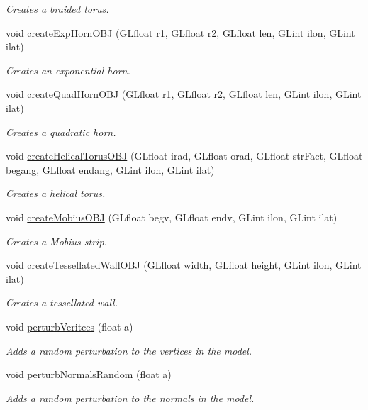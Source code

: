 \begin{DoxyCompactItemize}
\begin{DoxyCompactList}\small\item\em Creates a braided torus. \end{DoxyCompactList}\item 
void \hyperlink{class_models_a447859a7d2ec5fbe587b1172a223444e}{create\+Exp\+Horn\+O\+BJ} (G\+Lfloat r1, G\+Lfloat r2, G\+Lfloat len, G\+Lint ilon, G\+Lint ilat)
\begin{DoxyCompactList}\small\item\em Creates an exponential horn. \end{DoxyCompactList}\item 
void \hyperlink{class_models_afd82cc2a704f451f71ee1e28bbe32c3e}{create\+Quad\+Horn\+O\+BJ} (G\+Lfloat r1, G\+Lfloat r2, G\+Lfloat len, G\+Lint ilon, G\+Lint ilat)
\begin{DoxyCompactList}\small\item\em Creates a quadratic horn. \end{DoxyCompactList}\item 
void \hyperlink{class_models_a2504fa72fb311c5d58dff1d2bdfce25d}{create\+Helical\+Torus\+O\+BJ} (G\+Lfloat irad, G\+Lfloat orad, G\+Lfloat str\+Fact, G\+Lfloat begang, G\+Lfloat endang, G\+Lint ilon, G\+Lint ilat)
\begin{DoxyCompactList}\small\item\em Creates a helical torus. \end{DoxyCompactList}\item 
void \hyperlink{class_models_a420d727630be57b658a41d03c8f07c31}{create\+Mobius\+O\+BJ} (G\+Lfloat begv, G\+Lfloat endv, G\+Lint ilon, G\+Lint ilat)
\begin{DoxyCompactList}\small\item\em Creates a Mobius strip. \end{DoxyCompactList}\item 
void \hyperlink{class_models_abc441fa42f0079a0847e72f66131c8c9}{create\+Tessellated\+Wall\+O\+BJ} (G\+Lfloat width, G\+Lfloat height, G\+Lint ilon, G\+Lint ilat)
\begin{DoxyCompactList}\small\item\em Creates a tessellated wall. \end{DoxyCompactList}\item 
void \hyperlink{class_models_a055117dcb741c6c0e757d4bf656c9d37}{perturb\+Veritces} (float a)
\begin{DoxyCompactList}\small\item\em Adds a random perturbation to the vertices in the model. \end{DoxyCompactList}\item 
void \hyperlink{class_models_a7ad633fb35b0f6e083f92bd573c68201}{perturb\+Normals\+Random} (float a)
\begin{DoxyCompactList}\small\item\em Adds a random perturbation to the normals in the model. \end{DoxyCompactList}\end{DoxyCompactItemize}



